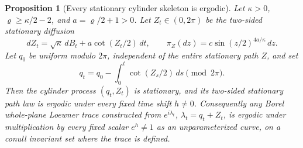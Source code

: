 \documentclass[11pt]{article}
\newtheorem{proposition}[theorem]{Proposition}
\theoremstyle{definition}\newtheorem{definition}[theorem]{Definition}
\theoremstyle{remark}\newtheorem{remark}[theorem]{Remark}
\begin{document}
\begin{proposition}[Every stationary cylinder skeleton is ergodic]
\label{prop:wp-cylinder-ergodic}
Let $\kappa>0$, $\varrho\ge\kappa/2-2$, and
$a=\varrho/2+1>0$.  Let $Z_t\in(0,2\pi)$ be the two-sided stationary
diffusion
\[
 dZ_t=\sqrt\kappa\,dB_t+a\cot(Z_t/2)\,dt,
 \qquad
 \pi_Z(dz)=c\sin(z/2)^{4a/\kappa}\,dz.
 \tag{WP8}
\]
Let $q_0$ be uniform modulo $2\pi$, independent of the entire
stationary path $Z$, and set
\[
 q_t=q_0-\int_0^t\cot(Z_s/2)\,ds\pmod{2\pi}.
 \tag{WP9}
\]
Then the cylinder process $(q_t,Z_t)$ is stationary, and its
two-sided stationary path law is ergodic under every fixed time
shift $h\ne0$.  Consequently any Borel whole-plane Loewner trace
constructed from $e^{i\lambda_t}$, $\lambda_t=q_t+Z_t$, is ergodic
under multiplication by every fixed scalar $e^h\ne1$ as an
unparameterized curve, on a conull invariant set where the trace is defined.
\end{proposition}
\end{document}
